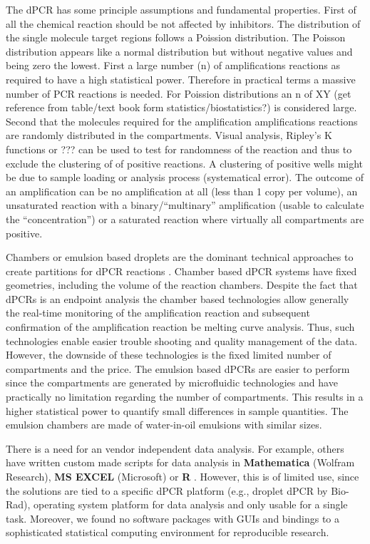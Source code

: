 \documentclass[a4,center,fleqn]{NAR}
\begin{document}
The dPCR has some principle assumptions and fundamental properties. First of all 
the chemical reaction should be not affected by inhibitors. The distribution of 
the single molecule target regions follows a Poission distribution. The Poisson 
distribution appears like a normal distribution but without negative values and 
being zero the lowest. First a large number (n) of amplifications reactions as 
required to have a high statistical power. Therefore in practical terms a 
massive number of PCR reactions is needed. For Poission distributions an n of XY 
(get reference from table/text book form statistics/biostatistics?) is 
considered large. Second that the molecules required for the amplification 
amplifications reactions are randomly distributed in the compartments. Visual 
analysis, Ripley's K functions or ??? can be used to test for randomness of the 
reaction and thus to exclude the clustering of of positive reactions. A 
clustering of positive wells might be due to sample loading or analysis process 
(systematical error). The outcome of an amplification can be no amplification at 
all (less than 1 copy per volume), an unsaturated reaction with a 
binary/``multinary'' amplification (usable to calculate the ``concentration'') 
or a saturated reaction where virtually all compartments are positive.

Chambers or emulsion based droplets are the dominant technical approaches to 
create partitions for dPCR  reactions \cite{morley_digital_2014}. Chamber based 
dPCR systems have fixed geometries, including the volume of the reaction 
chambers. Despite the fact that dPCRs is an endpoint analysis the chamber based 
technologies allow generally the real-time monitoring of the amplification 
reaction and subsequent confirmation of the amplification reaction be melting 
curve analysis. Thus, such technologies enable easier trouble shooting and 
quality management of the data. However, the downside of these technologies is 
the fixed limited number of compartments and the price. The emulsion based dPCRs 
are easier to perform since the compartments are generated by microfluidic 
technologies and have practically no limitation regarding the number of 
compartments. This results in a higher statistical power to quantify small 
differences in sample quantities. The emulsion chambers are made of water-in-oil 
emulsions with similar sizes.

There is a need for an vendor independent data analysis. For example, others 
have written custom made scripts for data analysis in \textbf{Mathematica} 
(Wolfram Research), \textbf{MS EXCEL} (Microsoft) or \textbf{R} 
\cite{strain_highly_2013, dreo_optimising_2014, trypsteen_ddpcrquant_2015, 
dobnik_multiplex_2015}. However, this is of limited use, since the solutions are 
tied to a specific dPCR platform (e.g., droplet dPCR by Bio-Rad), operating 
system platform for data analysis and only usable for a single task. Moreover, 
we found no software packages with GUIs and bindings to a sophisticated 
statistical computing environment for reproducible research. 
\end{document}
